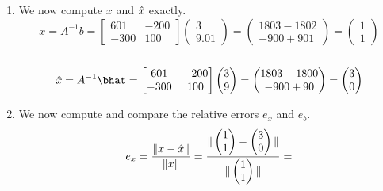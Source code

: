 \documentclass[11pt]{article}
\begin{document}
\begin{exercise}{2}
{\begin{enumerate}[label=\alph*)]
            \item We now compute $x$ and $\hat{x}$ exactly.
            $$
            x = A^{-1} b =
            \begin{bmatrix}
                601 & -200 \\
                -300 & 100
            \end{bmatrix}
            \begin{pmatrix}
                3 \\ 9.01
            \end{pmatrix}
            =
            \begin{pmatrix}
                1803 - 1802 \\ -900 + 901
            \end{pmatrix}
            =
            \begin{pmatrix}
                1 \\ 1
            \end{pmatrix}
            $$ \\
            $$
            \xhat = A^{-1} \bhat =
            \begin{bmatrix}
                601 & -200 \\
                -300 & 100
            \end{bmatrix}
            \begin{pmatrix}
                3 \\ 9
            \end{pmatrix}
            =
            \begin{pmatrix}
                1803 - 1800 \\ -900 + 90
            \end{pmatrix}
            =
            \begin{pmatrix}
                3 \\ 0
            \end{pmatrix}
            $$
            \item We now compute and compare the relative errors $e_x$ and $e_b$.
            $$
            e_x = \dfrac{\| x - \hat{x} \|}{\| x \|} =
            \dfrac{\| \begin{pmatrix} 1 \\ 1 \end{pmatrix} - \begin{pmatrix} 3 \\ 0 \end{pmatrix} \| }{\| \begin{pmatrix} 1 \\ 1 \end{pmatrix} \|} =
$$
\end{enumerate}}
\end{exercise}
\end{document}
